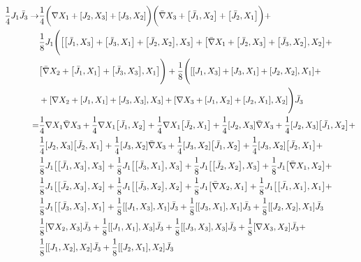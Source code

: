 \documentclass[12pt]{article}
\numberwithin{equation}{section}
\begin{document}
{\begin{align}
\frac{1}{4} J_1 \bar{J}_3 \to &\frac{1}{4} \biggr(\nabla X_1 + \comm{J_2}{X_3} + \comm{J_3}{X_2}\biggr) \biggr(\bar{\nabla} X_3  + \comm{\bar{J}_1}{X_2} + \comm{\bar{J}_2}{X_1}\biggr) + \nonumber \\
			      &\frac{1}{8} J_1 \Biggr(\comm{\comm{\bar{J}_1}{X_3} + \comm{\bar{J}_3}{X_1} + \comm{\bar{J}_2}{X_2}}{X_3} + \comm{\bar{\nabla} X_1 + \comm{\bar{J}_2}{X_3} + \comm{\bar{J}_3}{X_2}}{X_2} +\nonumber \\& \comm{\bar{\nabla} X_2 +\comm{\bar{J}_1}{X_1} + \comm{\bar{J}_3}{X_3}}{X_1}\Biggr) 			     + \frac{1}{8} \Biggr(\comm{\comm{J_1}{X_3} + \comm{J_3}{X_1} + \comm{J_2}{X_2}}{X_1} + \nonumber \\
			      & + \comm{\nabla X_2 +\comm{J_1}{X_1} + \comm{J_3}{X_3}}{X_3} + \comm{\nabla X_3  + \comm{J_1}{X_2} + \comm{J_2}{X_1}}{X_2}\Biggr) \bar{J}_3 \nonumber \\
=& \frac{1}{4}\nabla X_1 \bar{\nabla} X_3 + \frac{1}{4}\nabla X_1 \comm{\bar{J}_1}{X_2} + \frac{1}{4} \nabla X_1 \comm{\bar{J}_2}{X_1} + \frac{1}{4} \comm{J_2}{X_3} \bar{\nabla} X_3 + \frac{1}{4} \comm{J_2}{X_3} \comm{\bar{J}_1}{X_2} + \nonumber \\
 &\frac{1}{4} \comm{J_2}{X_3} \comm{\bar{J}_2}{X_1} + \frac{1}{4}\comm{J_3}{X_2} \bar{\nabla} X_3 + \frac{1}{4} \comm{J_3}{X_2}\comm{\bar{J}_1}{X_2} + \frac{1}{4} \comm{J_3}{X_2} \comm{\bar{J}_2}{X_1} + \nonumber \\
 &\frac{1}{8} J_1 \comm{\comm{\bar{J}_1}{X_3}}{X_3} + \frac{1}{8} J_1 \comm{\comm{\bar{J}_3}{X_1}}{X_3} + \frac{1}{8} J_1 \comm{\comm{\bar{J}_2}{X_2}}{X_3} + \frac{1}{8} J_1 \comm{\bar{\nabla} X_1}{X_2} + \nonumber \\
 &\frac{1}{8} J_1 \comm{\comm{\bar{J}_2}{X_3}}{X_2} + \frac{1}{8} J_1 \comm{\comm{\bar{J}_3}{X_2}}{X_2} + \frac{1}{8} J_1 \comm{\bar{\nabla }X_2}{X_1} + \frac{1}{8} J_1 \comm{\comm{\bar{J}_1}{X_1}}{X_1} + \nonumber \\
 &\frac{1}{8} J_1 \comm{\comm{\bar{J}_3}{X_3}}{X_1} + \frac{1}{8}\comm{\comm{J_1}{X_3}}{X_1} \bar{J}_3 + \frac{1}{8}\comm{\comm{
 J_3}{X_1}}{X_1}\bar{J}_3 + \frac{1}{8}\comm{\comm{J_2}{X_2}}{X_1}\bar{J}_3 \nonumber \\
 & \frac{1}{8}\comm{\nabla X_2}{X_3} \bar{J}_3 + \frac{1}{8}\comm{\comm{J_1}{X_1}}{X_3} \bar{J}_3 + \frac{1}{8}\comm{\comm{J_3}{X_3}}{X_3} \bar{J}_3 + \frac{1}{8}\comm{\nabla X_3}{X_2}\bar{J}_3 +\nonumber \\
 &\frac{1}{8}\comm{\comm{J_1}{X_2}}{X_2} \bar{J}_3 + \frac{1}{8}\comm{\comm{J_2}{X_1}}{X_2} \bar{J}_3
\end{align}

}
\end{document}
